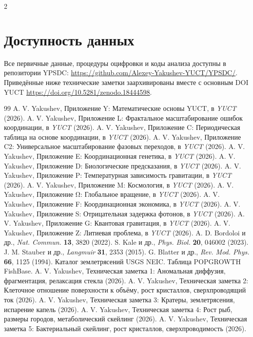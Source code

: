 \documentclass[11pt,a4paper]{article}
\begin{document}
\begin{multicols}{2}
		\section*{Доступность данных}
		
		Все первичные данные, процедуры оцифровки и коды анализа доступны в репозитории YPSDC: \url{https://github.com/Alexey-Yakushev-YUCT/YPSDC/}. Приведённые ниже технические заметки заархивированы вместе с основным DOI YUCT \url{https://doi.org/10.5281/zenodo.18444598}.
		
		\begin{thebibliography}{99}
			 A. V. Yakushev, Приложение Y: Математические основы YUCT, в \emph{YUCT} (2026).
			 A. V. Yakushev, Приложение L: Фрактальное масштабирование ошибок координации, в \emph{YUCT} (2026).
			 A. V. Yakushev, Приложение C: Периодическая таблица на основе координации, в \emph{YUCT} (2026).
			 A. V. Yakushev, Приложение C2: Универсальное масштабирование фазовых переходов, в \emph{YUCT} (2026).
			 A. V. Yakushev, Приложение E: Координационная генетика, в \emph{YUCT} (2026).
			 A. V. Yakushev, Приложение D: Биологические предсказания, в \emph{YUCT} (2026).
			 A. V. Yakushev, Приложение P: Температурная зависимость гравитации, в \emph{YUCT} (2026).
			 A. V. Yakushev, Приложение M: Космология, в \emph{YUCT} (2026).
			 A. V. Yakushev, Приложение Ω: Глобальное вращение, в \emph{YUCT} (2026).
			 A. V. Yakushev, Приложение F: Координационная экономика, в \emph{YUCT} (2026).
			 A. V. Yakushev, Приложение S: Отрицательная задержка фотонов, в \emph{YUCT} (2026).
			 A. V. Yakushev, Приложение G: Квантовая гравитация, в \emph{YUCT} (2026).
			 A. V. Yakushev, Приложение Z: Литиевая проблема, в \emph{YUCT} (2026).
			 A. D. Bordoloi и др., \emph{Nat. Commun.} \textbf{13}, 3820 (2022).
			 S. Kale и др., \emph{Phys. Biol.} \textbf{20}, 046002 (2023).
			 J. M. Stauber и др., \emph{Langmuir} \textbf{31}, 2353 (2015).
			 G. Blatter и др., \emph{Rev. Mod. Phys.} \textbf{66}, 1125 (1994).
			 Каталог землетрясений USGS NEIC.
			 Таблица POPGROWTH FishBase.
			 A. V. Yakushev, Техническая заметка 1: Аномальная диффузия, фрагментация, релаксация стекла (2026).
			 A. V. Yakushev, Техническая заметка 2: Клеточное отношение поверхности к объёму, рост кристаллов, сверхпроводящий ток (2026).
			 A. V. Yakushev, Техническая заметка 3: Кратеры, землетрясения, испарение капель (2026).
			 A. V. Yakushev, Техническая заметка 4: Рост рыб, размеры городов, метаболический скейлинг (2026).
			 A. V. Yakushev, Техническая заметка 5: Бактериальный скейлинг, рост кристаллов, сверхпроводимость (2026).
		\end{thebibliography}
		
	\end{multicols}
\end{document}
